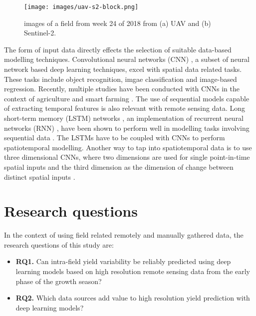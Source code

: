 \begin{figure}[htb]
    \centering
    \texttt{[image: images/uav-s2-block.png]}
    \caption{images of a field from week 24 of 2018 from (a) UAV and (b) Sentinel-2.}
    \label{fig:uav-s2-block}
\end{figure}

The form of input data directly effects the selection of suitable data-based modelling techniques. Convolutional neural networks (CNN) \cite{LeCun1989,LeCun1998b}, a subset of neural network based deep learning techniques, excel with spatial data related tasks. These tasks include object recognition, imgae classification and image-based regression. Recently, multiple studies have been conducted with CNNs in the context of agriculture and smart farming \cite{Kamilaris2018b}. The use of sequential models capable of extracting temporal features is also relevant with remote sensing data. Long short-term memory (LSTM) networks \cite{Hochreiter1997,Gers2000}, an implementation of recurrent neural networks (RNN) \cite{RumelhartDavidE1986Lrbb}, have been shown to perform well in modelling tasks involving sequential data \cite{Jozefowicz2015}. The LSTMs have to be coupled with CNNs to perform spatiotemporal modelling. Another way to tap into spatiotemporal data is to use three dimensional CNNs, where two dimensions are used for single point-in-time spatial inputs and the third dimension as the dimension of change between distinct spatial inputs \cite{Tran2015}. 

\section{Research questions}

In the context of using field related remotely and manually gathered data, the research questions of this study are:


\begin{itemize}
    \item[] \textbf{RQ1.} Can intra-field yield variability be reliably predicted using deep learning models based on high resolution remote sensing data from the early phase of the growth season?
    \item[] \textbf{RQ2.} Which data sources add value to high resolution yield prediction with deep learning models?
\end{itemize}


